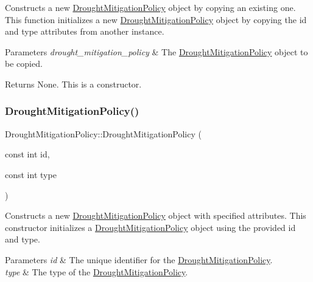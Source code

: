 Constructs a new \mbox{\hyperlink{classDroughtMitigationPolicy}{Drought\+Mitigation\+Policy}} object by copying an existing one. This function initializes a new \mbox{\hyperlink{classDroughtMitigationPolicy}{Drought\+Mitigation\+Policy}} object by copying the {\ttfamily id} and {\ttfamily type} attributes from another instance. 


\begin{DoxyParams}{Parameters}
{\em drought\+\_\+mitigation\+\_\+policy} & The \mbox{\hyperlink{classDroughtMitigationPolicy}{Drought\+Mitigation\+Policy}} object to be copied.\\
\hline
\end{DoxyParams}
\begin{DoxyReturn}{Returns}
None. This is a constructor. 
\end{DoxyReturn}
\mbox{\label{classDroughtMitigationPolicy_a00cce0117a5bc0c446727e0c0c59a8df}} 
\subsubsection{\texorpdfstring{Drought\+Mitigation\+Policy()}{DroughtMitigationPolicy()}\hspace{0.1cm}{\footnotesize\ttfamily [2/2]}}
{\footnotesize\ttfamily Drought\+Mitigation\+Policy\+::\+Drought\+Mitigation\+Policy (\begin{DoxyParamCaption}\item[{const int}]{id,  }\item[{const int}]{type }\end{DoxyParamCaption})}



Constructs a new \mbox{\hyperlink{classDroughtMitigationPolicy}{Drought\+Mitigation\+Policy}} object with specified attributes. This constructor initializes a \mbox{\hyperlink{classDroughtMitigationPolicy}{Drought\+Mitigation\+Policy}} object using the provided {\ttfamily id} and {\ttfamily type}. 


\begin{DoxyParams}{Parameters}
{\em id} & The unique identifier for the \mbox{\hyperlink{classDroughtMitigationPolicy}{Drought\+Mitigation\+Policy}}. \\
\hline
{\em type} & The type of the \mbox{\hyperlink{classDroughtMitigationPolicy}{Drought\+Mitigation\+Policy}}. \\
\hline
\end{DoxyParams}
\mbox{\label{classDroughtMitigationPolicy_a9419c433241f36cbf018a5bbe3059d5a}} 
